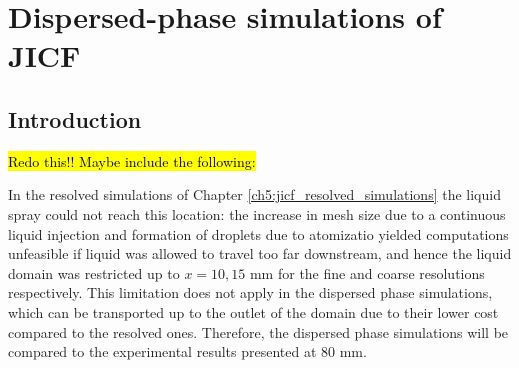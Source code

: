 \chapter{Dispersed-phase simulations of JICF}
	\label{ch6:jicf_lgs_simulations}


%
%
%	
%	
%	
%	
%


\section{Introduction}

\hl{Redo this!! Maybe include the following:}

In the resolved simulations of Chapter \ref{ch5:jicf_resolved_simulations} the liquid spray could not reach this location: the increase in mesh size due to a continuous liquid injection and formation of droplets due to atomizatio yielded computations unfeasible if liquid was allowed to travel too far downstream, and hence the liquid domain was restricted up to $x = 10, 15$ mm for the fine and coarse resolutions respectively. This limitation does not apply in the dispersed phase simulations, which can be transported up to the outlet of the domain due to their lower cost compared to the resolved ones. Therefore, the dispersed phase simulations will be compared to the experimental results presented at 80 mm.



